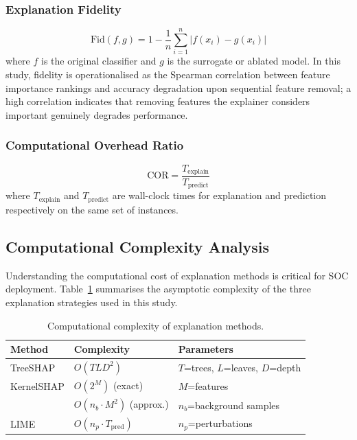 \documentclass[conference]{IEEEtran}
\begin{document}
\subsubsection{Explanation Fidelity}
\begin{equation}
  \text{Fid}(f, g) = 1 - \frac{1}{n}\sum_{i=1}^{n}
    \bigl|f(x_i) - g(x_i)\bigr|
  \label{eq:fidelity}
\end{equation}
where $f$ is the original classifier and $g$ is the surrogate or ablated model. In this study, fidelity is operationalised as the Spearman correlation between feature importance rankings and accuracy degradation upon sequential feature removal; a high correlation indicates that removing features the explainer considers important genuinely degrades performance.

\subsubsection{Computational Overhead Ratio}
\begin{equation}
  \text{COR} = \frac{T_{\text{explain}}}{T_{\text{predict}}}
  \label{eq:cor}
\end{equation}
where $T_{\text{explain}}$ and $T_{\text{predict}}$ are wall-clock times for explanation and prediction respectively on the same set of instances.

\subsection{Computational Complexity Analysis}

Understanding the computational cost of explanation methods is critical for SOC deployment. Table~\ref{tab:complexity} summarises the asymptotic complexity of the three explanation strategies used in this study.

\begin{table}[htbp]
\centering
\caption{Computational complexity of explanation methods.}
\label{tab:complexity}
\begin{tabular}{lll}
\toprule
\textbf{Method} & \textbf{Complexity} & \textbf{Parameters} \\
\midrule
TreeSHAP \cite{lundberg2020trees} & $O(TLD^2)$ & $T$=trees, $L$=leaves, $D$=depth \\
KernelSHAP \cite{lundberg2017}    & $O(2^M)$ (exact) & $M$=features \\
                                   & $O(n_b \cdot M^2)$ (approx.) & $n_b$=background samples \\
LIME \cite{ribeiro2016}            & $O(n_p \cdot T_{\text{pred}})$ & $n_p$=perturbations \\
\bottomrule
\end{tabular}
\end{table}
\end{document}

